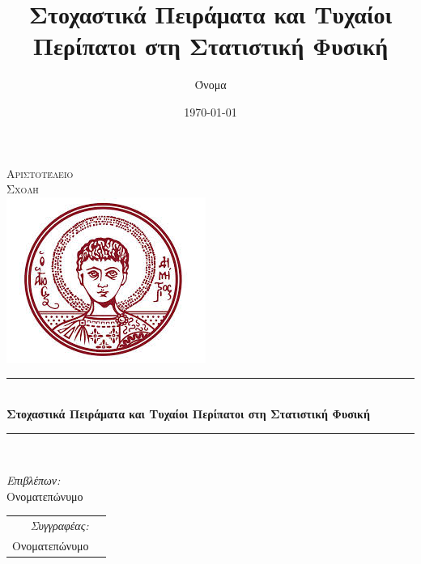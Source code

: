 \begin{titlepage}

\pagestyle{empty}
\title{Στοχαστικά Πειράματα και Τυχαίοι Περίπατοι στη Στατιστική Φυσική}
\author{Όνομα}
\date{\today}

\newcommand{\HRule}{\rule{\linewidth}{0.5mm}} %

\begin{center}
 

\textsc{Αριστοτέλειο}\\[1cm]
\textsc{Σχολή}\\[3.5cm] 

\includegraphics[scale=0.8]{figures/authsymbol.png}\\ %


\HRule \\[0.4cm]
{\Large \bfseries Στοχαστικά Πειράματα και Τυχαίοι Περίπατοι στη Στατιστική Φυσική}\\[0.4cm] %
\HRule \\[1.5cm]
 
\end{center}

\noindent
\begin{minipage}[t]{.49\textwidth}
\raggedright
\large
\emph{Επιβλέπων:}\\
Ονοματεπώνυμο
\end{minipage}%
%
\hfill
%
\begin{minipage}[t]{.49\textwidth}
\raggedleft
\begin{tabular}[t]{@{} r l @{}}
\large
\emph{Συγγραφέας:}\\
\large
Ονοματεπώνυμο
\end{tabular}
\end{minipage}\\
\end{titlepage}
